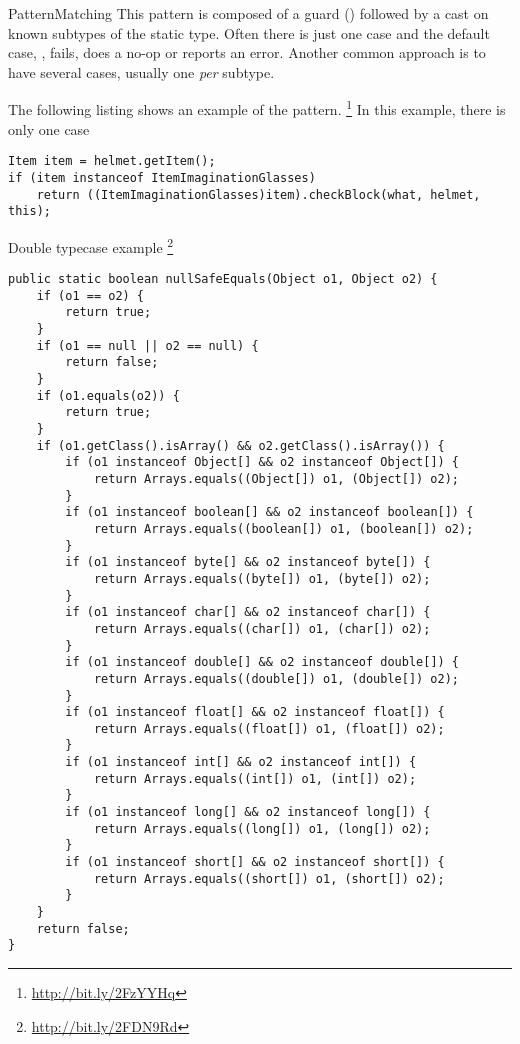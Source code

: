 
\begin{pattern}{PatternMatching}
This pattern is composed of a guard () followed by a
cast on known subtypes of the static type.
Often there is just one case and the default case, \ie,
 fails, does a no-op or reports an error.
Another common approach is to have several cases,
usually one \emph{per} subtype.

\instances{}
The following listing shows an example of the \thisp{} pattern.%
\footnote{\url{http://bit.ly/2FzYYHq}}
In this example, there is only one case

\begin{verbatim}
Item item = helmet.getItem();
if (item instanceof ItemImaginationGlasses)
	return ((ItemImaginationGlasses)item).checkBlock(what, helmet, this);
\end{verbatim}

Double typecase example
\footnote{\url{http://bit.ly/2FDN9Rd}}

\begin{verbatim}
public static boolean nullSafeEquals(Object o1, Object o2) {
	if (o1 == o2) {
		return true;
	}
	if (o1 == null || o2 == null) {
		return false;
	}
	if (o1.equals(o2)) {
		return true;
	}
	if (o1.getClass().isArray() && o2.getClass().isArray()) {
		if (o1 instanceof Object[] && o2 instanceof Object[]) {
			return Arrays.equals((Object[]) o1, (Object[]) o2);
		}
		if (o1 instanceof boolean[] && o2 instanceof boolean[]) {
			return Arrays.equals((boolean[]) o1, (boolean[]) o2);
		}
		if (o1 instanceof byte[] && o2 instanceof byte[]) {
			return Arrays.equals((byte[]) o1, (byte[]) o2);
		}
		if (o1 instanceof char[] && o2 instanceof char[]) {
			return Arrays.equals((char[]) o1, (char[]) o2);
		}
		if (o1 instanceof double[] && o2 instanceof double[]) {
			return Arrays.equals((double[]) o1, (double[]) o2);
		}
		if (o1 instanceof float[] && o2 instanceof float[]) {
			return Arrays.equals((float[]) o1, (float[]) o2);
		}
		if (o1 instanceof int[] && o2 instanceof int[]) {
			return Arrays.equals((int[]) o1, (int[]) o2);
		}
		if (o1 instanceof long[] && o2 instanceof long[]) {
			return Arrays.equals((long[]) o1, (long[]) o2);
		}
		if (o1 instanceof short[] && o2 instanceof short[]) {
			return Arrays.equals((short[]) o1, (short[]) o2);
		}
	}
	return false;
}
\end{verbatim}



\end{pattern}
